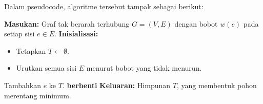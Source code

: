 Dalam pseudocode, algoritme tersebut tampak sebagai berikut:
\begin{algorithm}[H]
\caption{Algoritme Kruskal}
\begin{algorithmic}[1]
\State \textbf{Masukan:} Graf tak berarah terhubung \( G = (V, E) \) dengan bobot \( w(e) \) pada setiap sisi \( e \in E \).
\State \textbf{Inisialisasi:}
  \begin{itemize}
    \item Tetapkan \( T \gets \emptyset \).
    \item Urutkan semua sisi \( E \) menurut bobot yang tidak menurun.
  \end{itemize}
    \State Tambahkan \( e \) ke \( T \).
  \EndIf
    \State \textbf{berhenti}
  \EndIf
\EndFor
\State \textbf{Keluaran:} Himpunan \( T \), yang membentuk pohon merentang minimum.
\end{algorithmic}
\end{algorithm}
